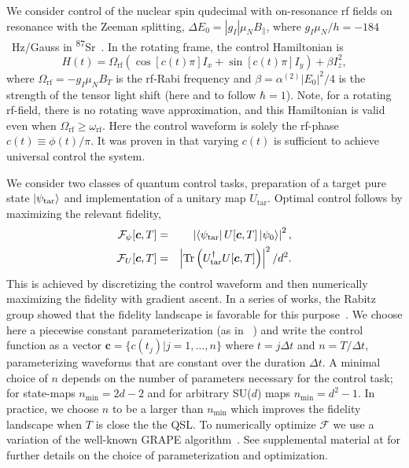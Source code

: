 \documentclass[aps,prl,twocolumn,reprint,superscriptaddress,footinbib]{revtex4-2}
\newcommand{\mjm}[1]{\textcolor{purple}{#1}}
\begin{document}
We consider control of the nuclear spin qudecimal with on-resonance rf fields  on resonance with the Zeeman splitting,  $\Delta E_0 = |g_I| \mu_N B_\parallel$, where $g_I \mu_N/h  = -184$~Hz/Gauss in \textsuperscript{87}Sr~\cite{olschewski1972messung}. In the rotating frame, the control Hamiltonian is
\begin{equation}
H(t)=\Omega_{\mathrm{rf}} \left( \cos[c(t) \pi]I_x+\sin[c(t) \pi] I_y\right)+\beta I_z^2,
\label{eq:Control_Hamiltonian}
\end{equation}
where $\Omega_\text{rf} = -g_I \mu_N B_T $ is the  rf-Rabi frequency and $\beta = \alpha^{(2)} \left|E_0\right|^2/4$ is the strength of the tensor light shift (here and to follow $\hbar=1$). Note, for a rotating rf-field, there is no rotating wave approximation, and this Hamiltonian is valid even when $\Omega_\text{rf} \ge \omega_\text{rf}$. Here the  control waveform is solely the rf-phase $c(t) \equiv \phi(t)/\pi$.   It was proven in \cite{Merkel2008} that varying $c(t)$ is sufficient to achieve universal control the system. 

We consider two classes of quantum control tasks, preparation of a target pure state $\ket{\psi_\text{tar}}$ and implementation of a unitary map $U_\text{tar}$.  Optimal control follows by maximizing the relevant fidelity,
\begin{eqnarray}
\mathcal{F}_{\psi}[\bm{c},T]&=&\left|\bra{\psi_{\text{tar}}}U[\bm{c},T]\ket{\psi_0}\right|^2,\\
\mathcal{F}_U[\bm{c},T]&=&\left|\Tr\left(U^{\dagger}_{\text{tar}}U[\bm{c},T]\right)\right|^2/d^2.
\label{eq:fidelity}
\end{eqnarray} 
This is achieved by discretizing the control waveform and then numerically maximizing the fidelity with gradient ascent.   In a series of works, the Rabitz group showed that the fidelity landscape is favorable for this purpose~\cite{
rabitz2004quantum,Hsieh2008}.  We choose here a piecewise constant parameterization (as in ~\cite{Merkel2008}) and write the control function as a vector $\mathbf{c} = \{c(t_j) | j=1,\dots,n\}$ where $t=j\Delta t$ and $n=T/\Delta t$, parameterizing waveforms that are constant over the duration $\Delta t$.  A minimal choice of $n$ depends on the number of parameters necessary for the control task; for state-maps $n_\text{min} = 2d-2$ and for arbitrary SU($d$) maps $n_\text{min} = d^2-1$.  In practice, we choose $n$ to be a larger than $n_\text{min}$ which improves the fidelity landscape when $T$ is close the the QSL. To numerically optimize $\mathcal{F}$ we use a variation of the well-known GRAPE algorithm~\cite{khaneja2005optimal}. See supplemental material at \cite{notes1} for further details on the choice of parameterization and optimization.
 
\end{document}

